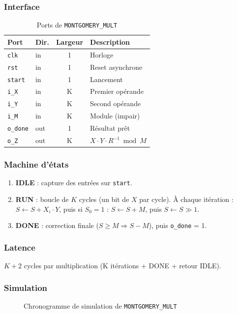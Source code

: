 \documentclass[12pt,a4paper]{report}
\begin{document}
\subsubsection{Interface}
\begin{table}[H]
\centering
\caption{Ports de \texttt{MONTGOMERY\_MULT}}
\begin{tabular}{llcp{5cm}}
\toprule
\textbf{Port} & \textbf{Dir.} & \textbf{Largeur} & \textbf{Description} \\
\midrule
\texttt{clk}    & in  & 1 & Horloge \\
\texttt{rst}    & in  & 1 & Reset asynchrone \\
\texttt{start}  & in  & 1 & Lancement \\
\texttt{i\_X}   & in  & K & Premier opérande \\
\texttt{i\_Y}   & in  & K & Second opérande \\
\texttt{i\_M}   & in  & K & Module (impair) \\
\texttt{o\_done} & out & 1 & Résultat prêt \\
\texttt{o\_Z}    & out & K & $X \cdot Y \cdot R^{-1} \bmod M$ \\
\bottomrule
\end{tabular}
\end{table}


\subsubsection{Machine d'états}
\begin{enumerate}
  \item \textbf{IDLE} : capture des entrées sur \texttt{start}.
  \item \textbf{RUN} : boucle de $K$ cycles (un bit de $X$ par cycle).
        À chaque itération :
        $S \leftarrow S + X_i \cdot Y$, puis
        si $S_0 = 1$ : $S \leftarrow S + M$, puis
        $S \leftarrow S \gg 1$.
  \item \textbf{DONE} : correction finale ($S \geq M \Rightarrow S - M$),
        puis \texttt{o\_done} = 1.
\end{enumerate}

\subsubsection{Latence}
$K + 2$ cycles par multiplication (K itérations + DONE + retour IDLE).

\subsubsection{Simulation}
\begin{figure}[H]
\centering
{}
\caption{Chronogramme de simulation de \texttt{MONTGOMERY\_MULT}}
\label{fig:sim_mont}
\end{figure}
\end{document}
